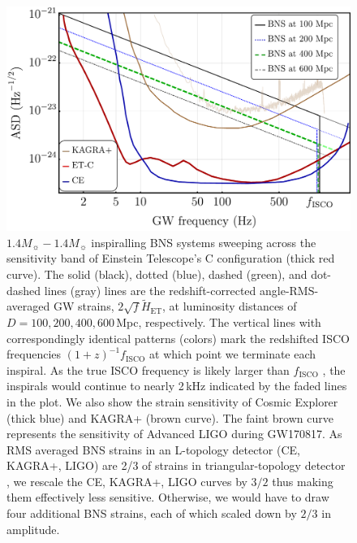 \documentclass{aa}
\begin{document}
\begin{figure}[t!]
\includegraphics[width=\linewidth]{../Figs/ET_strains_redshifted_v2.pdf}
\caption{%
$1.4 M_\sun-1.4 M_\sun$ inspiralling BNS systems sweeping across the sensitivity band of Einstein Telescope's C configuration (thick red curve).
The solid (black), dotted (blue), dashed (green), and dot-dashed lines (gray) lines are the redshift-corrected
angle-RMS-averaged GW strains, $2\sqrt{f}\tilde{H}_\text{ET}$, at luminosity distances of $D=100, 200, 400, 600\,$Mpc, respectively. 
The vertical lines with correspondingly identical patterns (colors) mark the redshifted ISCO frequencies $(1+z)^{-1} f_\text{ISCO}$ at which point we terminate each inspiral.
As the true ISCO frequency is likely larger than $f_\text{ISCO}$ \citep{Marronetti:2003hx}, the inspirals would continue to nearly 2\,kHz indicated by the faded lines in the plot.
We also show the strain sensitivity of Cosmic Explorer (thick blue) and KAGRA+ (brown curve).
The faint brown curve represents the sensitivity of Advanced LIGO during GW170817.
As RMS averaged BNS strains in an L-topology detector (CE, KAGRA+, LIGO) are 2/3 of strains in triangular-topology detector \citep{Akcay18}, we rescale the CE, KAGRA+, LIGO curves by $3/2$ thus making them effectively less sensitive.
Otherwise, we would have to draw four additional BNS strains, each of which scaled down by $2/3$ in amplitude.
}
\label{fig:ETB2030}
\end{figure}
%
%
%
\end{document}
